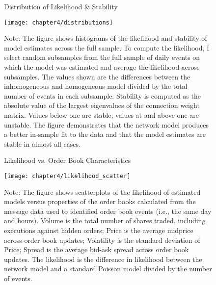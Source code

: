 \begin{figure}[ht!]
\small
\linespread{1}
\centering
\captionsetup{labelsep=colon, font=footnotesize, justification=centerfirst, width=\linewidth}
\caption{Distribution of Likelihood \& Stability}
\label{fig:distributions}
\texttt{[image: chapter4/distributions]}
\captionsetup{position=below, font=footnotesize, justification=justified, width=\linewidth}
\caption*{Note: The figure shows histograms of the likelihood and stability of model estimates across the full sample. To compute the likelihood, I select random subsamples from the full sample of daily events on which the model was estimated and average the likelihood across subsamples. The values shown are the differences between the inhomogeneous and homogeneous model divided by the total number of events in each subsample. Stability is computed as the absolute value of the largest eigenvalues of the connection weight matrix. Values below one are stable; values at and above one are unstable.  The figure demonstrates that the network model produces a better in-sample fit to the data and that the model estimates are stable in almost all cases.}
\end{figure}

\begin{figure}[ht!]
\small
\linespread{1}
\centering
\captionsetup{labelsep=colon, font=footnotesize, justification=centerfirst, width=\linewidth}
\caption{Likelihood vs. Order Book Characteristics}
\label{fig:likelihood_scatter}
\texttt{[image: chapter4/likelihood\_scatter]}
\captionsetup{position=below, font=footnotesize, justification=justified, width=\linewidth}
\caption*{Note: The figure shows scatterplots of the likelihood of estimated models versus properties of the order books calculated from the message data used to identified order book events (i.e., the same day and hours). Volume is the total number of shares traded, including executions against hidden orders; Price is the average midprice across order book updates; Volatility is the standard deviation of Price; Spread is the average bid-ask spread across order book updates. The likelihood is the difference in likelihood between the network model and a standard Poisson model divided by the number of events.}
\end{figure}

